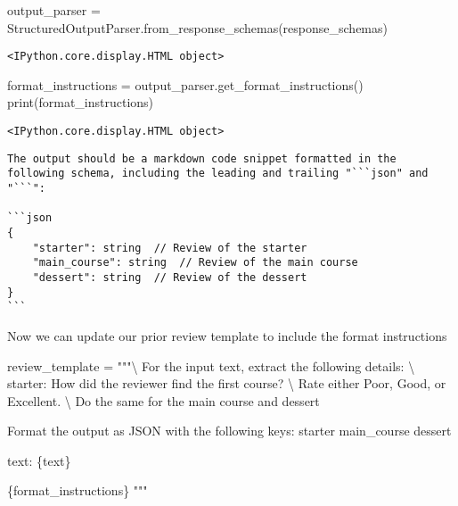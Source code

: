 \documentclass[
  letterpaper,
  DIV=11,
  numbers=noendperiod]{scrreprt}
\newenvironment{Shaded}{\begin{snugshade}}{\end{snugshade}}
\newcommand{\BuiltInTok}[1]{\textcolor[rgb]{0.00,0.23,0.31}{#1}}
\newcommand{\CharTok}[1]{\textcolor[rgb]{0.13,0.47,0.30}{#1}}
\newcommand{\NormalTok}[1]{\textcolor[rgb]{0.00,0.23,0.31}{#1}}
\newcommand{\OperatorTok}[1]{\textcolor[rgb]{0.37,0.37,0.37}{#1}}
\newcommand{\SpecialCharTok}[1]{\textcolor[rgb]{0.37,0.37,0.37}{#1}}
\newcommand{\StringTok}[1]{\textcolor[rgb]{0.13,0.47,0.30}{#1}}
\begin{document}
\begin{Shaded}
\begin{Highlighting}[]
\NormalTok{output\_parser }\OperatorTok{=}\NormalTok{ StructuredOutputParser.from\_response\_schemas(response\_schemas)}
\end{Highlighting}
\end{Shaded}

\begin{verbatim}
<IPython.core.display.HTML object>
\end{verbatim}

\begin{Shaded}
\begin{Highlighting}[]
\NormalTok{format\_instructions }\OperatorTok{=}\NormalTok{ output\_parser.get\_format\_instructions()}
\BuiltInTok{print}\NormalTok{(format\_instructions)}
\end{Highlighting}
\end{Shaded}

\begin{verbatim}
<IPython.core.display.HTML object>
\end{verbatim}

\begin{verbatim}
The output should be a markdown code snippet formatted in the following schema, including the leading and trailing "```json" and "```":

```json
{
    "starter": string  // Review of the starter
    "main_course": string  // Review of the main course
    "dessert": string  // Review of the dessert
}
```
\end{verbatim}

Now we can update our prior review template to include the format
instructions

\begin{Shaded}
\begin{Highlighting}[]
\NormalTok{review\_template }\OperatorTok{=} \StringTok{"""}\CharTok{\textbackslash{}}
\StringTok{For the input text, extract the following details: }\CharTok{\textbackslash{}}
\StringTok{starter: How did the reviewer find the first course? }\CharTok{\textbackslash{}}
\StringTok{Rate either Poor, Good, or Excellent. }\CharTok{\textbackslash{}}
\StringTok{Do the same for the main course and dessert}

\StringTok{Format the output as JSON with the following keys:}
\StringTok{starter}
\StringTok{main\_course}
\StringTok{dessert}

\StringTok{text: }\SpecialCharTok{\{text\}}

\SpecialCharTok{\{format\_instructions\}}
\StringTok{"""}
\end{Highlighting}
\end{Shaded}
\end{document}
